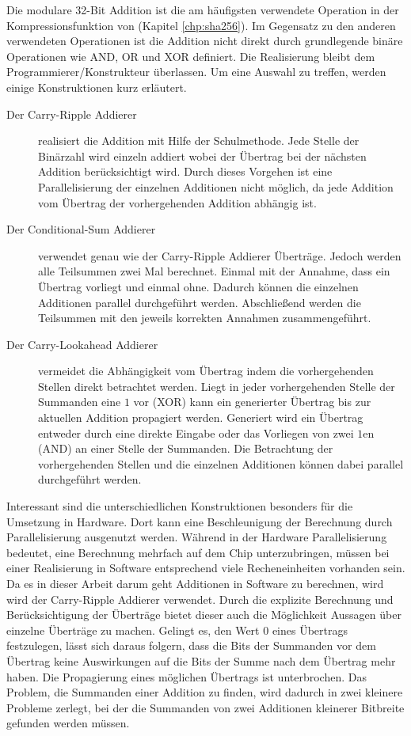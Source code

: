 Die modulare 32-Bit Addition ist die am häufigsten verwendete Operation in der Kompressionsfunktion von  (Kapitel \ref{chp:sha256}).
Im Gegensatz zu den anderen verwendeten Operationen ist die Addition nicht direkt durch grundlegende binäre Operationen wie AND, OR und XOR definiert.
Die Realisierung bleibt dem Programmierer/Konstrukteur überlassen. Um eine Auswahl zu treffen, werden einige Konstruktionen kurz erläutert.
\begin{description}
  \item[Der Carry-Ripple Addierer] realisiert die Addition mit Hilfe der Schulmethode. Jede Stelle der Binärzahl wird einzeln addiert wobei der Übertrag bei der nächsten
                                   Addition berücksichtigt wird. Durch dieses Vorgehen ist eine Parallelisierung der einzelnen Additionen nicht möglich, da jede
                                   Addition vom Übertrag der vorhergehenden Addition abhängig ist.
  \item[Der Conditional-Sum Addierer] verwendet genau wie der Carry-Ripple Addierer Überträge. Jedoch werden alle Teilsummen zwei Mal berechnet. Einmal mit der Annahme,
                                      dass ein Übertrag vorliegt und einmal ohne. Dadurch können die einzelnen Additionen parallel durchgeführt werden. Abschließend
                                      werden die Teilsummen mit den jeweils korrekten Annahmen zusammengeführt.
  \item[Der Carry-Lookahead Addierer] vermeidet die Abhängigkeit vom Übertrag indem die vorhergehenden Stellen direkt betrachtet werden. Liegt in jeder vorhergehenden
                                      Stelle der Summanden eine $1$ vor (XOR) kann ein generierter Übertrag bis zur aktuellen Addition propagiert werden. Generiert wird
                                      ein Übertrag entweder durch eine direkte Eingabe oder das Vorliegen von zwei $1$en (AND) an einer Stelle der Summanden. Die Betrachtung
                                      der vorhergehenden Stellen und die einzelnen Additionen können dabei parallel durchgeführt werden.
\end{description}
Interessant sind die unterschiedlichen Konstruktionen besonders für die Umsetzung in Hardware. Dort kann eine Beschleunigung der Berechnung durch Parallelisierung
ausgenutzt werden. Während in der Hardware Parallelisierung bedeutet, eine Berechnung mehrfach auf dem Chip unterzubringen, müssen bei einer Realisierung in Software
entsprechend viele Recheneinheiten vorhanden sein. Da es in dieser Arbeit darum geht Additionen in Software zu berechnen, wird wird der Carry-Ripple Addierer verwendet.
Durch die explizite Berechnung und Berücksichtigung der Überträge bietet dieser auch die Möglichkeit Aussagen über einzelne Überträge zu machen. Gelingt es, den Wert $0$
eines Übertrags festzulegen, lässt sich daraus folgern, dass die Bits der Summanden vor dem Übertrag keine Auswirkungen auf die Bits der Summe nach dem Übertrag mehr haben.
Die Propagierung eines möglichen Übertrags ist unterbrochen. Das Problem, die Summanden einer Addition zu finden, wird dadurch in zwei kleinere Probleme zerlegt, bei der
die Summanden von zwei Additionen kleinerer Bitbreite gefunden werden müssen.

